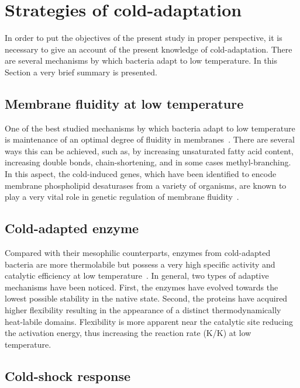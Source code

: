 \section{Strategies of cold-adaptation}

In order to put the objectives of the present study in proper
perspective, it is necessary to give an account of the present
knowledge of cold-adaptation. There are several mechanisms by
which bacteria adapt to low temperature. In this Section a very
brief summary is presented.

\subsection{Membrane fluidity at low temperature}

One of the best studied mechanisms by which bacteria adapt to low
temperature is maintenance  of an optimal degree of fluidity in
membranes~\citep[reviewed in][]{Russell1990a,Russell1998}. There
are several ways this can be achieved, such as, by increasing
unsaturated fatty acid content, increasing  double bonds,
chain-shortening, and in some cases methyl-branching. In this
aspect, the cold-induced  genes, which have been identified
to encode membrane phospholipid desaturases from a variety of
organisms, are known to play a very vital role in genetic
regulation of membrane fluidity~\citep[for a recent review
see][]{Sakamoto2002}.

\subsection{Cold-adapted enzyme}

Compared with their mesophilic counterparts, enzymes from
cold-adapted bacteria are more thermolabile but possess a very
high specific activity and catalytic efficiency at low
temperature~\citep[reviewed
in][]{Feller1997,Gerday1997,Lonhienne2000}. In general, two types
of adaptive mechanisms have been noticed. First, the enzymes have
evolved towards the lowest possible stability in the native state.
Second, the proteins have acquired higher flexibility resulting in
the appearance of a distinct thermodynamically heat-labile
domains. Flexibility is more apparent near the catalytic site
reducing the activation energy, thus increasing the reaction rate
(K/K) at low temperature.

\subsection{Cold-shock response}

